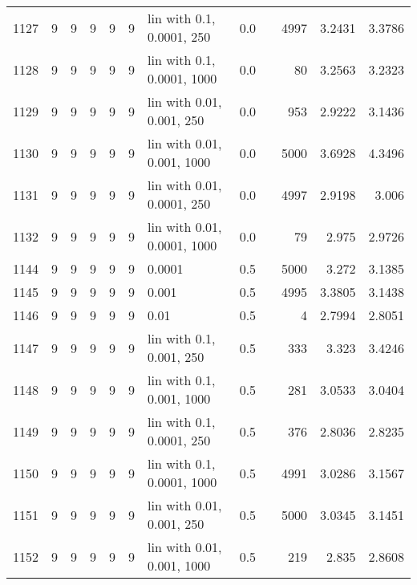 \begin{longtable}{lrrrrrlrrrrr}
1127 &       9 & 9 & 9 & 9 & 9 &   lin with 0.1, 0.0001, 250 &  0.0 &        &    4997 &                 3.2431 &                 3.3786 \\
1128 &       9 & 9 & 9 & 9 & 9 &  lin with 0.1, 0.0001, 1000 &  0.0 &        &      80 &                 3.2563 &                 3.2323 \\
1129 &       9 & 9 & 9 & 9 & 9 &   lin with 0.01, 0.001, 250 &  0.0 &        &     953 &                 2.9222 &                 3.1436 \\
1130 &       9 & 9 & 9 & 9 & 9 &  lin with 0.01, 0.001, 1000 &  0.0 &        &    5000 &                 3.6928 &                 4.3496 \\
1131 &       9 & 9 & 9 & 9 & 9 &  lin with 0.01, 0.0001, 250 &  0.0 &        &    4997 &                 2.9198 &                  3.006 \\
1132 &       9 & 9 & 9 & 9 & 9 & lin with 0.01, 0.0001, 1000 &  0.0 &        &      79 &                  2.975 &                 2.9726 \\
1144 &       9 & 9 & 9 & 9 & 9 &                      0.0001 &  0.5 &        &    5000 &                  3.272 &                 3.1385 \\
1145 &       9 & 9 & 9 & 9 & 9 &                       0.001 &  0.5 &        &    4995 &                 3.3805 &                 3.1438 \\
1146 &       9 & 9 & 9 & 9 & 9 &                        0.01 &  0.5 &        &       4 &                 2.7994 &                 2.8051 \\
1147 &       9 & 9 & 9 & 9 & 9 &    lin with 0.1, 0.001, 250 &  0.5 &        &     333 &                  3.323 &                 3.4246 \\
1148 &       9 & 9 & 9 & 9 & 9 &   lin with 0.1, 0.001, 1000 &  0.5 &        &     281 &                 3.0533 &                 3.0404 \\
1149 &       9 & 9 & 9 & 9 & 9 &   lin with 0.1, 0.0001, 250 &  0.5 &        &     376 &                 2.8036 &                 2.8235 \\
1150 &       9 & 9 & 9 & 9 & 9 &  lin with 0.1, 0.0001, 1000 &  0.5 &        &    4991 &                 3.0286 &                 3.1567 \\
1151 &       9 & 9 & 9 & 9 & 9 &   lin with 0.01, 0.001, 250 &  0.5 &        &    5000 &                 3.0345 &                 3.1451 \\
1152 &       9 & 9 & 9 & 9 & 9 &  lin with 0.01, 0.001, 1000 &  0.5 &        &     219 &                  2.835 &                 2.8608 \\

\end{longtable}
